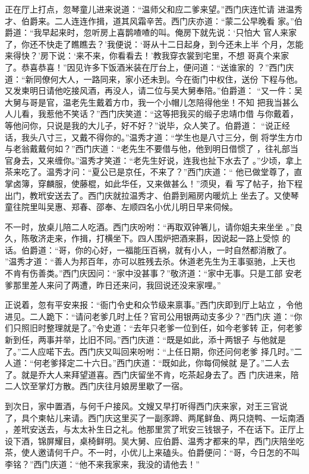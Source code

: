 正在厅上打点，忽琴童儿进来说道：“温师父和应二爹来望。”西门庆连忙请
进温秀才、伯爵来。二人连连作揖，道其风霜辛苦。西门庆亦道：“蒙二公早晚看
家。”伯爵道：“我早起来时，忽听房上喜鹊喳喳的叫。俺房下就先说：‘只怕大
官人来家了，你还不快走了瞧瞧去？’我便说：‘哥从十二日起身，到今还未上半
个月，怎能来得快？’房下说：‘来不来，你看看去！’教我穿衣裳到宅里，不想
哥真个来家了。恭喜恭喜！”因见许多下饭酒米装在厅台上，便问道：“送谁家的
？”西门庆道：“新同僚何大人，一路同来，家小还未到。今在衙门中权住，送份
下程与他。又发柬明日请他吃接风酒，再没人，请二位与吴大舅奉陪。”伯爵道：
“又一件：吴大舅与哥是官，温老先生戴着方巾，我一个小帽儿怎陪得他坐！不知
把我当甚么人儿看，我惹他不笑话？”西门庆笑道：“这等把我买的缎子忠靖巾借
与你戴着，等他问你，只说是我的大儿子，好不好？”说毕，众人笑了。伯爵道：
“说正经话，我头八寸三，又戴不得你的。”温秀才道：“学生也是八寸三分，倒
将学生方巾与老翁戴戴何如？”西门庆道：“老先生不要借与他，他到明日借惯了
，往礼部当官身去，又来缠你。”温秀才笑道：“老先生好说，连我也扯下水去了
。”少顷，拿上茶来吃了。温秀才问：“夏公已是京任，不来了？”西门庆道：“
他已做堂尊了，直掌卤簿，穿麟服，使藤棍，如此华任，又来做甚么！”须臾，看
写了帖子，抬下程出门，教玳安送去了。西门庆就拉温秀才、伯爵到厢房内暖炕上
坐去了。又使琴童往院里叫吴惠、郑春、邵奉、左顺四名小优儿明日早来伺候。

不一时，放桌儿陪二人吃酒。西门庆吩咐：“再取双钟箸儿，请你姐夫来坐坐
。”良久，陈敬济走来，作揖，打横坐下。四人围炉把酒来斟，因说起一路上受惊
的话。伯爵道：“哥，你的心好，一福能压百祸，就有小人，一时自然都消散了。
”温秀才道：“善人为邦百年，亦可以胜残去杀。休道老先生为王事驱驰，上天也
不肯有伤善类。”西门庆因问：“家中没甚事？”敬济道：“家中无事。只是工部
安老爹那里差人来问了两遭，昨日还来问，我回说还没来家哩。”

正说着，忽有平安来报：“衙门令史和众节级来禀事。”西门庆即到厅上站立
，令他进见。二人跪下：“请问老爹几时上任？官司公用银两动支多少？”西门庆
道：“你们只照旧时整理就是了。”令史道：“去年只老爹一位到任，如今老爹转
正，何老爹新到任，两事并举，比旧不同。”西门庆道：“既是如此，添十两银子
与他就是了。”二人应喏下去。西门庆又叫回来吩咐：“上任日期，你还问何老爹
择几时。”二人道：“何老爹择定二十六日。”西门庆道：“既如此，你每伺候就
是了。”二人去了。就是乔大人来拜望道喜。西门庆留坐不肯，吃茶起身去了。西
门庆进来，陪二人饮至掌灯方散。西门庆往月娘房里歇了一宿。

到次日，家中置酒，与何千户接风。文嫂又早打听得西门庆来家，对王三官说
了，具个柬帖儿来请。西门庆这里买了一副豕蹄、两尾鲜鱼、两只烧鸭、一坛南酒
，差玳安送去，与太太补生日之礼。他那里赏了玳安三钱银子，不在话下。正厅上
设下酒，锦屏耀目，桌椅鲜明。吴大舅、应伯爵、温秀才都来的早，西门庆陪坐吃
茶，使人邀请何千户。不一时，小优儿上来磕头。伯爵便问：“哥，今日怎的不叫
李铭？”西门庆道：“他不来我家来，我没的请他去！”

